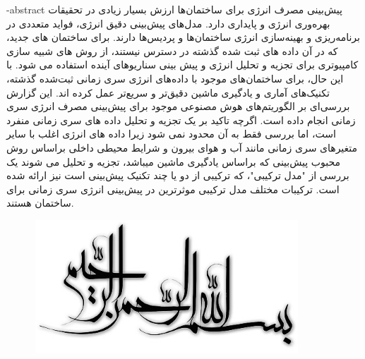\department{}

\fa-abstract{
    پیش‌بینی مصرف انرژی برای ساختمان‌ها ارزش بسیار زیادی در تحقیقات بهره‌وری انرژی و پایداری دارد. مدل‌های پیش‌بینی دقیق انرژی، فواید متعددی در برنامه‌ریزی
     و بهینه‌سازی انرژی ساختمان‌ها و پردیس‌ها دارند. برای ساختمان های جدید، 
    که در آن داده های ثبت شده گذشته در دسترس نیستند، از روش های شبیه سازی کامپیوتری برای تجزیه و تحلیل انرژی و پیش بینی سناریوهای آینده استفاده می شود. 
    با این حال، برای ساختمان‌های موجود با داده‌های انرژی سری زمانی ثبت‌شده گذشته، تکنیک‌های آماری و یادگیری ماشین دقیق‌تر و سریع‌تر عمل کرده اند. 
    این گزارش بررسی‌ای بر الگوریتم‌های هوش مصنوعی موجود برای پیش‌بینی مصرف انرژی سری زمانی انجام داده است.
     اگرچه تاکید بر یک تجزیه و تحلیل داده های سری زمانی منفرد است، اما بررسی فقط به آن محدود نمی شود زیرا داده های انرژی 
     اغلب با سایر متغیرهای سری زمانی مانند آب و هوای بیرون و شرایط محیطی داخلی براساس روش محبوب پیش‌بینی که براساس یادگیری ماشین میباشد، تجزیه و تحلیل می شوند 
      یک بررسی از "مدل ترکیبی"، که ترکیبی از دو یا چند تکنیک پیش‌بینی است نیز ارائه شده است.
      ترکیبات مختلف مدل ترکیبی موثرترین در پیش‌بینی انرژی سری زمانی برای ساختمان هستند.
}




\AUTtitle
\vspace*{7cm}
\thispagestyle{empty}
\begin{center}
\includegraphics[height=5cm,width=12cm]{besm}
\end{center}
